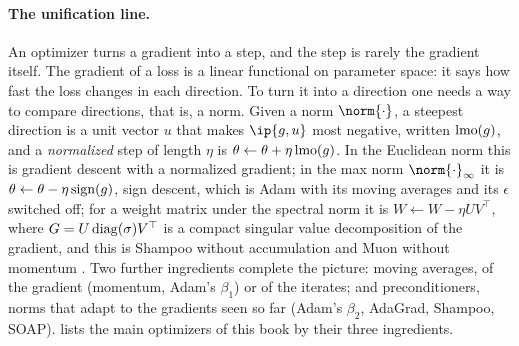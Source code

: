 \begin{refsection}
\paragraph{The unification line.} An optimizer turns a gradient into a step, and the step is rarely the gradient itself. The gradient of a loss is a linear functional on parameter space: it says how fast the loss changes in each direction. To turn it into a direction one needs a way to compare directions, that is, a norm. Given a norm $\norm{\cdot}$, a steepest direction is a unit vector $u$ that makes $\ip{g,u}$ most negative, written $\operatorname{lmo}(g)$, and a \emph{normalized} step of length $\eta$ is $\theta\leftarrow\theta+\eta\operatorname{lmo}(g)$. In the Euclidean norm this is gradient descent with a normalized gradient; in the max norm $\norm{\cdot}_\infty$ it is $\theta\leftarrow\theta-\eta\operatorname{sign}(g)$, sign descent, which is Adam with its moving averages and its $\epsilon$ switched off; for a weight matrix under the spectral norm it is $W\leftarrow W-\eta UV^\top$, where $G=U\operatorname{diag}(\sigma)V^\top$ is a compact singular value decomposition of the gradient, and this is Shampoo without accumulation \parencite{BernsteinNewhouse2024} and Muon without momentum \parencite{JordanEtAl2024Muon}. Two further ingredients complete the picture: moving averages, of the gradient (momentum, Adam's $\beta_1$) or of the iterates; and preconditioners, norms that adapt to the gradients seen so far (Adam's $\beta_2$, AdaGrad, Shampoo, SOAP).  lists the main optimizers of this book by their three ingredients.


\end{refsection}

